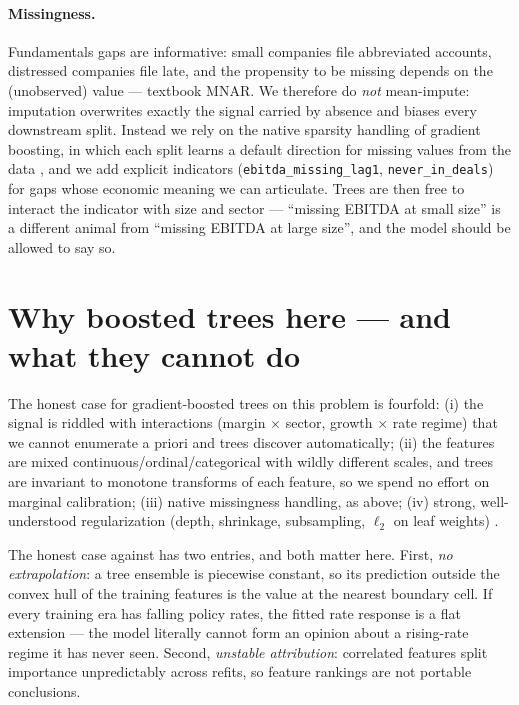 \paragraph{Missingness.}
Fundamentals gaps are informative: small companies file abbreviated accounts, distressed
companies file late, and the propensity to be missing depends on the (unobserved) value
--- textbook MNAR. We therefore do \emph{not} mean-impute: imputation overwrites exactly
the signal carried by absence and biases every downstream split. Instead we rely on the
native sparsity handling of gradient boosting, in which each split learns a default
direction for missing values from the data \cite{chen2016}, and we add explicit
indicators (\texttt{ebitda\_missing\_lag1}, \texttt{never\_in\_deals}) for gaps whose
economic meaning we can articulate. Trees are then free to interact the indicator with
size and sector --- ``missing EBITDA at small size'' is a different animal from ``missing
EBITDA at large size'', and the model should be allowed to say so.

\section{Why boosted trees here --- and what they cannot do}
\label{sec:xgb-why}

The honest case for gradient-boosted trees on this problem is fourfold: (i) the signal is
riddled with interactions (margin $\times$ sector, growth $\times$ rate regime) that we
cannot enumerate a priori and trees discover automatically; (ii) the features are mixed
continuous/ordinal/categorical with wildly different scales, and trees are invariant to
monotone transforms of each feature, so we spend no effort on marginal calibration;
(iii) native missingness handling, as above; (iv) strong, well-understood regularization
(depth, shrinkage, subsampling, $\ell_2$ on leaf weights) \cite{chen2016}.

The honest case against has two entries, and both matter here. First, \emph{no
extrapolation}: a tree ensemble is piecewise constant, so its prediction outside the
convex hull of the training features is the value at the nearest boundary cell. If every
training era has falling policy rates, the fitted rate response is a flat extension ---
the model literally cannot form an opinion about a rising-rate regime it has never seen.
Second, \emph{unstable attribution}: correlated features split importance
unpredictably across refits, so feature rankings are not portable conclusions.

